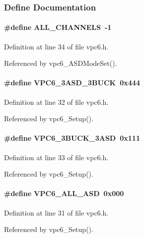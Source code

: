 \subsubsection{Define Documentation}
\paragraph[{ALL\_\-CHANNELS}]{\setlength{\rightskip}{0pt plus 5cm}\#define ALL\_\-CHANNELS~-\/1}\hfill\label{vpc6_8h_ac9dcdba2096f6b3adab742b8b1a256c2}


Definition at line 34 of file vpc6.h.

Referenced by vpc6\_\-ASDModeSet().
\paragraph[{VPC6\_\-3ASD\_\-3BUCK}]{\setlength{\rightskip}{0pt plus 5cm}\#define VPC6\_\-3ASD\_\-3BUCK~0x444}\hfill\label{vpc6_8h_a2c0fb4a304a0dcf05ccc6385878818d3}


Definition at line 32 of file vpc6.h.

Referenced by vpc6\_\-Setup().
\paragraph[{VPC6\_\-3BUCK\_\-3ASD}]{\setlength{\rightskip}{0pt plus 5cm}\#define VPC6\_\-3BUCK\_\-3ASD~0x111}\hfill\label{vpc6_8h_a2f60144ea0232c5b64d559396a035731}


Definition at line 33 of file vpc6.h.

Referenced by vpc6\_\-Setup().
\paragraph[{VPC6\_\-ALL\_\-ASD}]{\setlength{\rightskip}{0pt plus 5cm}\#define VPC6\_\-ALL\_\-ASD~0x000}\hfill\label{vpc6_8h_ab1341dac1102bce31e001f9c7b499eec}


Definition at line 31 of file vpc6.h.

Referenced by vpc6\_\-Setup().

